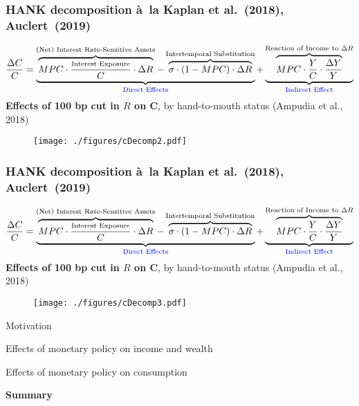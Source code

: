 \documentclass[pdflatex,aspectratio=169]{beamer}
\newcommand{\jemph}[1]{{\color{StataDarkBlue}#1}}
\newcommand{\jbemph}[1]{\textbf{\color{SlideNavy}#1}}
\begin{document}
\begin{frame}\frametitle{\bf HANK decomposition \`a\ la Kaplan et al.~(2018), Auclert~(2019)}
\vspace*{-2.5mm}
\footnotesize
$$
\frac{\Delta C}{C}=\underbrace{\overbrace{MPC\cdot\frac{\text{\scriptsize{Interest Exposure}}}{C}\cdot\Delta R}^{\text{(Net) Interest Rate-Sensitive Assets}}-\overbrace{\sigma\cdot(1-MPC)\cdot\Delta R}^{\text{Intertemporal Substitution}}}_{\text{\jemph{Direct Effects}}}+\underbrace{\overbrace{MPC\cdot\frac{Y}{C}\cdot\frac{\Delta Y}{Y}}^{\text{Reaction of Income to $\Delta R$}}}_{\text{\jemph{Indirect Effect}}}
$$
\small
\jbemph{Effects of 100 bp cut in $R$ on C}, by hand-to-mouth status (Ampudia et al., 2018)
\begin{figure}
\begin{center}
\texttt{[image: ./figures/cDecomp2.pdf]}
\end{center}
\end{figure}
\end{frame}



\begin{frame}\frametitle{\bf HANK decomposition \`a\ la Kaplan et al.~(2018), Auclert~(2019)}
\vspace*{-2.5mm}
\footnotesize
$$
\frac{\Delta C}{C}=\underbrace{\overbrace{MPC\cdot\frac{\text{\scriptsize{Interest Exposure}}}{C}\cdot\Delta R}^{\text{(Net) Interest Rate-Sensitive Assets}}-\overbrace{\sigma\cdot(1-MPC)\cdot\Delta R}^{\text{Intertemporal Substitution}}}_{\text{\jemph{Direct Effects}}}+\underbrace{\overbrace{MPC\cdot\frac{Y}{C}\cdot\frac{\Delta Y}{Y}}^{\text{Reaction of Income to $\Delta R$}}}_{\text{\jemph{Indirect Effect}}}
$$
\small
\jbemph{Effects of 100 bp cut in $R$ on C}, by hand-to-mouth status (Ampudia et al., 2018)
\begin{figure}
\begin{center}
\texttt{[image: ./figures/cDecomp3.pdf]}
\end{center}
\end{figure}
\end{frame}



\begin{frame}
\bi\setlength{\itemsep}{3mm}
\item Motivation
\item Effects of monetary policy on income and wealth
\item Effects of monetary policy on consumption
\item \jbemph{Summary}
\ei
\end{frame}
\end{document}

